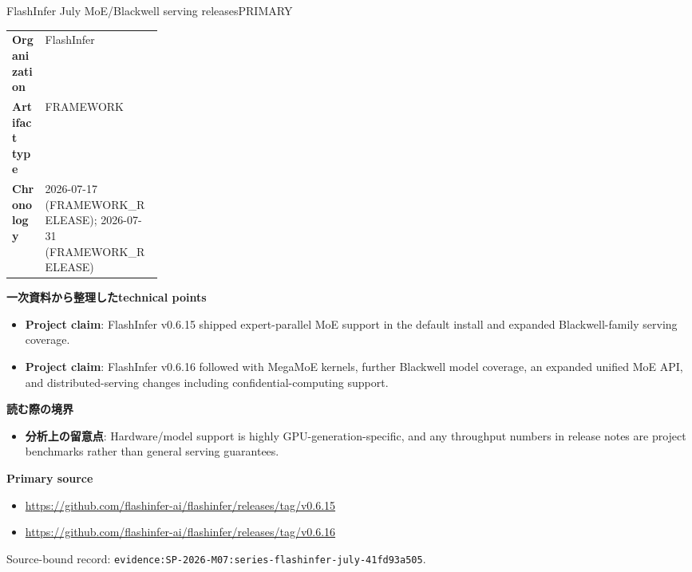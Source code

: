 \begin{technicalnote}{FlashInfer July MoE/Blackwell serving releases}{PRIMARY}
\begin{tabularx}{\linewidth}{@{}>{\bfseries}p{0.22\linewidth}X@{}}
Organization & FlashInfer \\
Artifact type & FRAMEWORK \\
Chronology & 2026-07-17 (FRAMEWORK\_RELEASE); 2026-07-31 (FRAMEWORK\_RELEASE) \\
\end{tabularx}
\smallskip
{\bfseries 一次資料から整理したtechnical points}
\begin{itemize}[leftmargin=1.5em,itemsep=0.35em]
\item \textbf{Project claim}: FlashInfer v0.6.15 shipped expert-parallel MoE support in the default install and expanded Blackwell-family serving coverage.
\item \textbf{Project claim}: FlashInfer v0.6.16 followed with MegaMoE kernels, further Blackwell model coverage, an expanded unified MoE API, and distributed-serving changes including confidential-computing support.
\end{itemize}
{\bfseries 読む際の境界}
\begin{itemize}[leftmargin=1.5em,itemsep=0.35em]
\item \textbf{分析上の留意点}: Hardware/model support is highly GPU-generation-specific, and any throughput numbers in release notes are project benchmarks rather than general serving guarantees.
\end{itemize}
{\bfseries Primary source}
\begin{itemize}[leftmargin=1.5em,itemsep=0.25em]
\item \url{https://github.com/flashinfer-ai/flashinfer/releases/tag/v0.6.15}
\item \url{https://github.com/flashinfer-ai/flashinfer/releases/tag/v0.6.16}
\end{itemize}
{\scriptsize\color{SurveyMuted}Source-bound record: \texttt{evidence:SP-2026-M07:series-flashinfer-july-41fd93a505}.}
\end{technicalnote}
\medskip

